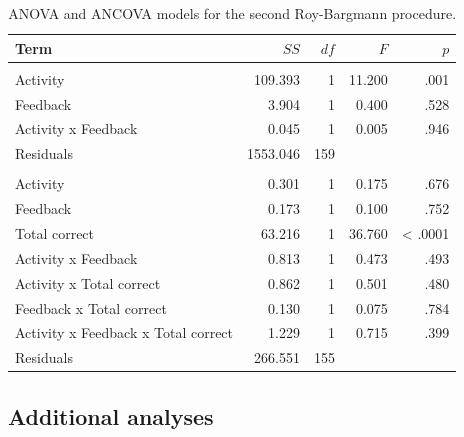 \documentclass[11pt,]{article}
\begin{document}
\begin{table}[t]

\caption{\label{tab:rb2Table}\label{rb2-table}ANOVA and ANCOVA models for the second Roy-Bargmann
                     procedure.}
\centering
\begin{tabular}{lrrrr}
\toprule
Term & $SS$ & $df$ & $F$ & $p$\\
\midrule
\addlinespace[0.3em]
\multicolumn{5}{l}{\textbf{ANOVA}}\\
\hspace{1em}Activity & 109.393 & 1 & 11.200 & .001\\
\hspace{1em}Feedback & 3.904 & 1 & 0.400 & .528\\
\hspace{1em}Activity x Feedback & 0.045 & 1 & 0.005 & .946\\
\hspace{1em}Residuals & 1553.046 & 159 &  & \\
\addlinespace[0.3em]
\multicolumn{5}{l}{\textbf{ANCOVA}}\\
\hspace{1em}Activity & 0.301 & 1 & 0.175 & .676\\
\hspace{1em}Feedback & 0.173 & 1 & 0.100 & .752\\
\hspace{1em}Total correct & 63.216 & 1 & 36.760 & < .0001\\
\hspace{1em}Activity x Feedback & 0.813 & 1 & 0.473 & .493\\
\hspace{1em}Activity x Total correct & 0.862 & 1 & 0.501 & .480\\
\hspace{1em}Feedback x Total correct & 0.130 & 1 & 0.075 & .784\\
\hspace{1em}Activity x Feedback x Total correct & 1.229 & 1 & 0.715 & .399\\
\hspace{1em}Residuals & 266.551 & 155 &  & \\
\bottomrule
\end{tabular}
\end{table}

\hypertarget{additional-analyses}{%
\subsection{Additional analyses}\label{additional-analyses}}
\end{document}
